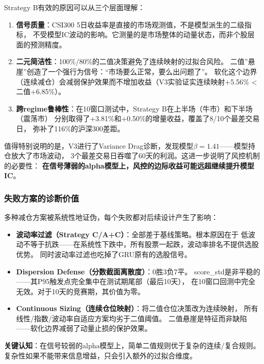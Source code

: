 \documentclass[12pt,a4paper]{ctexart}
\begin{document}
Strategy B有效的原因可以从三个层面理解：
\begin{enumerate}[leftmargin=*]
    \item \textbf{信号质量}：CSI300 5日收益率是直接的市场观测值，不是模型派生的二级指标，
          不受模型IC波动的影响。它测量的是市场整体的动量状态，而非个股层面的预测精度。
    \item \textbf{二元简洁性}：100\%/80\%的二值决策避免了连续映射的过拟合风险。
          二值”悬崖”创造了一个强行为信号：“市场要么正常，要么出问题了”。
          软化这个边界（连续减仓）会减弱保护效果而不增加收益（V3实验证实连续映射+5.56\% < 二值+6.85\%）。
    \item \textbf{跨regime鲁棒性}：在10窗口测试中，Strategy B在上半场（牛市）和下半场（震荡市）
          分别取得了+3.81\%和+0.50\%的增量收益，覆盖了8/10个最差交易日，
          弥补了116\%的沪深300差距。
\end{enumerate}

值得特别说明的是，V3进行了Variance Drag诊断，发现模型$\beta=1.41$——模型持仓放大了市场波动，
3个最差交易日吞噬了60天的利润。这进一步说明了风控机制的必要性：
\textbf{在信号薄弱的alpha模型上，风控的边际收益可能远超继续提升模型IC}。

\subsubsection{失败方案的诊断价值}

多种减仓方案被系统性地证伪，每个失败都对后续设计产生了影响：

\begin{itemize}[leftmargin=*]
    \item \textbf{波动率过滤（Strategy C/A+C）}：全部差于基线策略。根本原因在于
          低波动不等于抗跌——在系统性下跌中，所有股票一起跌，波动率排名不提供选股优势。
          同时波动率过滤也吃掉了GRU原有的选股信号。
    \item \textbf{Dispersion Defense（分数截面离散度）}：0胜3负7平。
          score\_std是非平稳的——其P95触发点完全集中在测试期尾部（最后10天），
          在10窗口回测中完全无效。对于10天的竞赛期，其价值为零。
    \item \textbf{Continuous Sizing（连续仓位映射）}：将二值仓位决策改为连续映射，
          所有线性/指数/波动率自适应方案均劣于二值阈值。
          二值悬崖是特征而非缺陷——软化边界减弱了动量止损的保护效果。
\end{itemize}

\textbf{关键认知}：在信号较弱的alpha模型上，简单二值规则优于复杂的连续/复合规则。
复杂性如果不能带来信息增益，只会引入额外的过拟合维度。
\end{document}
